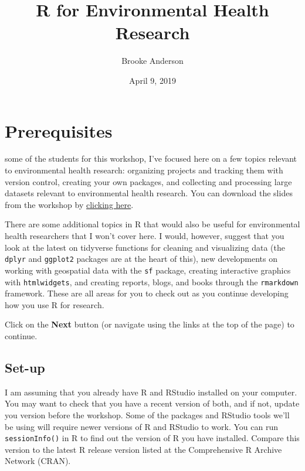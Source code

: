 \documentclass[]{tufte-book}
\title{R for Environmental Health Research}
\author{Brooke Anderson}
\date{April 9, 2019}
\begin{document}
\maketitle



{
\setcounter{tocdepth}{1}
\tableofcontents
}

\hypertarget{prerequisites}{%
\chapter{Prerequisites}\label{prerequisites}}

 some of the students for this
workshop, I've focused here on a few topics relevant to environmental health
research: organizing projects and tracking them with version control, creating
your own packages, and collecting and processing large datasets relevant to
environmental health research. You can download the slides from the workshop by
\href{https://github.com/geanders/columbia_env_health/raw/master/_workshop_slides/workshop_slides.pdf}{clicking
here}.

There are some additional topics in R that would also be useful for
environmental health researchers that I won't cover here. I would, however,
suggest that you look at the latest on tidyverse functions for cleaning and
visualizing data (the \texttt{dplyr} and \texttt{ggplot2} packages are at the heart of this),
new developments on working with geospatial data with the \texttt{sf} package, creating
interactive graphics with \texttt{htmlwidgets}, and creating reports, blogs, and books
through the \texttt{rmarkdown} framework. These are all areas for you to check out as you
continue developing how you use R for research.

Click on the \textbf{Next} button (or navigate using the
links at the top of the page) to continue.

\hypertarget{set-up}{%
\section{Set-up}\label{set-up}}

I am assuming that you already have R and RStudio installed on your computer.
You may want to check that you have a recent version of both, and if not, update
you version before the workshop. Some of the packages and RStudio tools we'll be
using will require newer versions of R and RStudio to work. You can run
\texttt{sessionInfo()} in R to find out the version of R you have installed. Compare
this version to the latest R release version listed at the Comprehensive R
Archive Network (CRAN).
\end{document}
